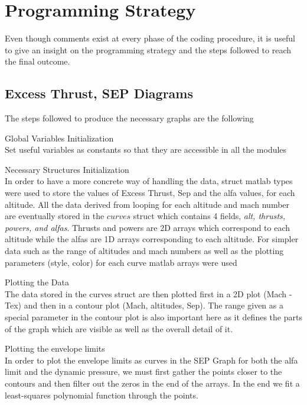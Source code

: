 \section{Programming Strategy}
\label{sec:coding}

Even though comments exist at every phase of the coding procedure, it is useful to give
an insight on the programming strategy and the steps followed to reach the final outcome.

\subsection{Excess Thrust, SEP Diagrams}

The steps followed to produce the necessary graphs are the following
\begin{description*}
    \item [Global Variables Initialization] \hfill \\
        Set useful variables as constants so that they are accessible in all the modules
    \item [Necessary Structures Initialization] \hfill \\
        In order to have a more concrete way of handling the data, struct matlab types were 
        used to store the values of Excess Thrust, Sep and the alfa values, for each altitude.
        All the data derived from looping for each altitude and mach number are eventually stored 
        in the $curves$ struct which contains 4 fields, \textit{alt, thrusts, powers, and alfas}.
        Thrusts and powers are 2D arrays which correspond to each altitude while the 
        alfas are 1D arrays corresponding to each altitude.
        For simpler data such as the range of altitudes and mach numbers as well 
        as the plotting parameters (style, color) for each curve matlab arrays were used
    \item [Plotting the Data] \hfill \\
        The data stored in the curves struct are then plotted first in a 2D plot (Mach - Tex)
        and then in a contour plot (Mach, altitudes, Sep). The range given as a special 
        parameter in the contour plot is also important here as it defines the parts of 
        the graph which are visible as well as the overall detail of it.
    \item [Plotting the envelope limits] \hfill \\
        In order to plot the envelope limits as curves in the SEP Graph for both 
        the alfa limit and the dynamic pressure,
        we must first gather the points closer to the contours
        and then filter out the zeros in the end of the arrays. In the end we fit a 
        least-squares polynomial function through the points.
\end{description*}

